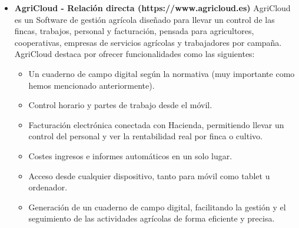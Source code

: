 \begin{itemize}
    \item \textbf{AgriCloud - Relación directa (https://www.agricloud.es)}
    \newline
    AgriCloud es un Software de gestión agrícola diseñado para llevar un control de las fincas, trabajos, personal y
    facturación, pensada para agricultores, cooperativas, empresas de servicios agrícolas y trabajadores por campaña.
    AgriCloud destaca por ofrecer funcionalidades como las siguientes:
    \begin{itemize}
        \item Un cuaderno de campo digital según la normativa (muy importante como hemos mencionado anteriormente).
        \item Control horario y partes de trabajo desde el móvil.
        \item Facturación electrónica conectada con Hacienda, permitiendo llevar un control del personal y ver la
        rentabilidad real por finca o cultivo.
        \item Costes ingresos e informes automáticos en un solo lugar.
        \item Acceso desde cualquier dispositivo, tanto para móvil como tablet u ordenador.
        \item Generación de un cuaderno de campo digital, facilitando la gestión y el seguimiento de las actividades
        agrícolas de forma eficiente y precisa.
    \end{itemize} 


\end{itemize}
